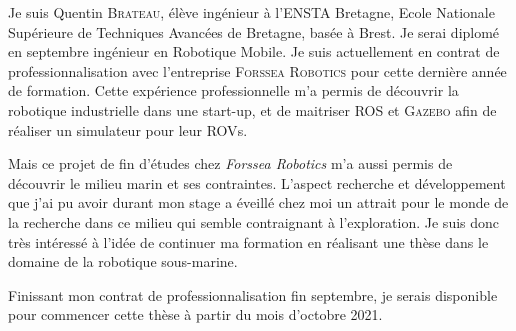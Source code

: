 \documentclass[11pt, a4paper]{awesome-cv}
\begin{document}
	\makecvheader[C]


	\makelettertitle

	\begin{cvletter}

		Je suis Quentin \textsc{Brateau}, élève ingénieur à l'\textsc{ENSTA} Bretagne, Ecole Nationale Supérieure de Techniques Avancées de Bretagne, basée à Brest. Je serai diplomé en septembre ingénieur en Robotique Mobile. Je suis actuellement en contrat de professionnalisation avec l'entreprise \textsc{Forssea Robotics} pour cette dernière année de formation. Cette expérience professionnelle m'a permis de découvrir la robotique industrielle dans une start-up, et de maitriser \textsc{ROS} et \textsc{Gazebo} afin de réaliser un simulateur pour leur \textsc{ROV}s.
		
		Mais ce projet de fin d'études chez \textit{Forssea Robotics} m'a aussi permis de découvrir le milieu marin et ses contraintes. L'aspect recherche et développement que j'ai pu avoir durant mon stage a éveillé chez moi un attrait pour le monde de la recherche dans ce milieu qui semble contraignant à l'exploration. Je suis donc très intéressé à l'idée de continuer ma formation en réalisant une thèse dans le domaine de la robotique sous-marine.

		Finissant mon contrat de professionnalisation fin septembre, je serais disponible pour commencer cette thèse à partir du mois d'octobre 2021.

	\end{cvletter}

	\makeletterclosing
\end{document}
